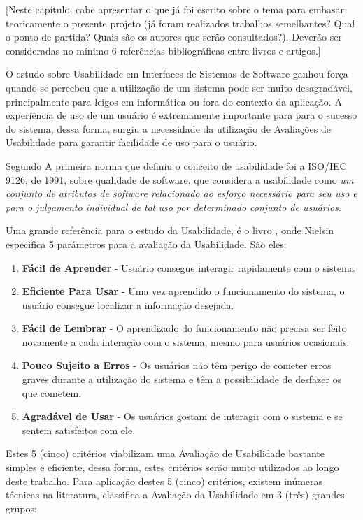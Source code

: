 
[Neste capítulo, cabe apresentar o que já foi escrito sobre o tema para embasar teoricamente o presente projeto (já foram realizados trabalhos semelhantes? Qual o ponto de partida? Quais são os autores que serão consultados?). Deverão ser consideradas no mínimo 6 referências bibliográficas entre livros e artigos.]

O estudo sobre Usabilidade em Interfaces de Sistemas de Software ganhou força quando se percebeu que a utilização de um sistema pode ser muito desagradável, principalmente para leigos em informática ou fora do contexto da aplicação. A experiência de uso de um usuário é extremamente importante para para o sucesso do sistema, dessa forma, surgiu a necessidade da utilização de Avaliações de Usabilidade para garantir facilidade de uso para o usuário.

Segundo \cite{avaliacao_heuristica} A primeira norma que definiu o conceito de usabilidade foi a ISO/IEC 9126, de 1991, sobre qualidade de software, que considera a usabilidade como \textit{um conjunto de atributos de software relacionado ao esforço necessário para seu uso e para o julgamento individual de tal uso por determinado conjunto de usuários}.

Uma grande referência para o estudo da Usabilidade, é o livro \cite{usabilidade_web}, onde Nielsin especifica 5 parâmetros para a avaliação da Usabilidade. São eles: 

\begin{enumerate}
  \item \textbf{Fácil de Aprender} - Usuário consegue interagir rapidamente com o sistema
  \item \textbf{Eficiente Para Usar} - Uma vez aprendido o funcionamento do sistema, o usuário consegue localizar a informação desejada.
  \item \textbf{Fácil de Lembrar} - O aprendizado do funcionamento não precisa ser feito novamente a cada interação com o sistema, mesmo para usuários ocasionais.
  \item \textbf{Pouco Sujeito a Erros} - Os usuários não têm perigo de cometer erros graves durante a utilização do
sistema e têm a possibilidade de desfazer os que cometem.
  \item \textbf{Agradável de Usar} - Os usuários gostam de interagir com o sistema e se sentem satisfeitos com ele.
\end{enumerate}

Estes 5 (cinco) critérios viabilizam uma Avaliação de Usabilidade bastante simples e eficiente, dessa forma, estes critérios serão muito utilizados ao longo deste trabalho. Para aplicação destes 5 (cinco) critérios, existem inúmeras técnicas na literatura, \cite{avaliacao_usa} classifica a Avaliação da Usabilidade em 3 (três) grandes grupos:
\\

